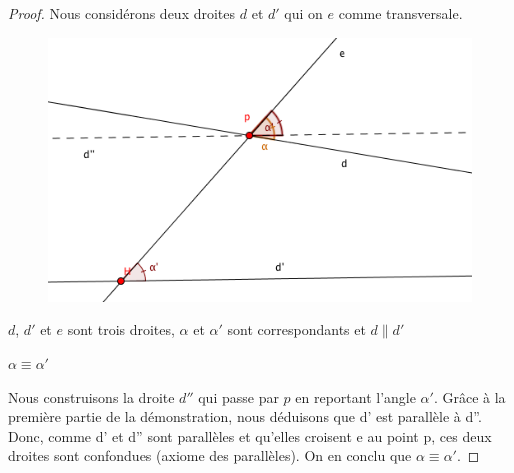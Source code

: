\documentclass[a4paper,12pt]{article}
\begin{document}
\begin{proof}
Nous considérons deux droites $d$ et $d'$ qui on $e$ comme transversale.

 \begin{figure}[H]
    \centering
    \includegraphics[scale=0.6]{theorems/transversal/Transversale_4.png}
\end{figure}


\begin{hyp}
     $d$, $d'$ et $e$ sont trois droites,
     $\alpha$ et $\alpha'$ sont correspondants et
     $d \parallel d'$
 \end{hyp}
 \begin{concl}
     $\alpha \equiv \alpha'$
 \end{concl}
 Nous construisons la droite $d''$ qui passe par $p$ en reportant l'angle $\alpha'$. Grâce à la première partie de la démonstration, nous déduisons que d' est parallèle à d''. Donc, comme d' et d'' sont parallèles et qu'elles croisent e au point p, ces deux droites sont confondues (axiome des parallèles). On en conclu que $\alpha \equiv \alpha'$.
\end{proof}
\end{document}
